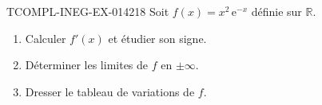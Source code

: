 \begin{exercice}{TCOMPL-INEG-EX-014}{2}{18}
Soit $f(x) = x^2\,\mathrm{e}^{-x}$ définie sur $\mathbb{R}$.
\begin{enumerate}
  \item Calculer $f'(x)$ et étudier son signe.
  \item Déterminer les limites de $f$ en $\pm\infty$.
  \item Dresser le tableau de variations de $f$.
\end{enumerate}

\end{exercice}
